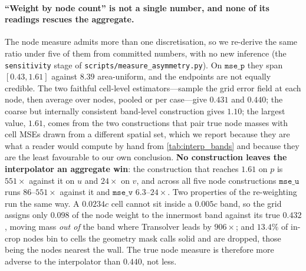 \paragraph{``Weight by node count'' is not a single number, and none of its readings
rescues the aggregate.} The node measure admits more than one discretisation, so we
re-derive the same ratio under five of them from committed numbers, with no new inference
(the \texttt{sensitivity} stage of \texttt{scripts\slash{}measure\_asymmetry.py}). On
$\texttt{mse\_p}$ they span $[0.43,1.61]$ against $8.39$ area-uniform, and the endpoints
are not equally credible. The two faithful cell-level estimators---sample the grid error
field at each node, then average over nodes, pooled or per case---give $0.431$ and
$0.440$; the coarse but internally consistent band-level construction gives $1.10$; the
largest value, $1.61$, comes from the two constructions that pair true node masses with
cell MSEs drawn from a different spatial set, which we report because they are what a
reader would compute by hand from \autoref{tab:interp_bands} and because they are the
least favourable to our own conclusion. \textbf{No construction leaves the interpolator an
aggregate win}: the construction that reaches $1.61$ on $p$ is $551\times$ against it on $u$ and
$24\times$ on $v$, and across all five node constructions $\texttt{mse\_u}$ runs
$86$--$551\times$ against it and $\texttt{mse\_v}$ $6.3$--$24\times$. Two
properties of the re-weighting run the same way. A $0.0234c$ cell cannot sit inside a
$0.005c$ band, so the grid assigns only $0.098$ of the node weight to the innermost band
against its true $0.432$, moving mass \emph{out of} the band where Transolver leads by
$906\times$; and $13.4\%$ of in-crop nodes bin to cells the geometry mask calls solid and
are dropped, those being the nodes nearest the wall. The true node measure is therefore
more adverse to the interpolator than $0.440$, not less.

